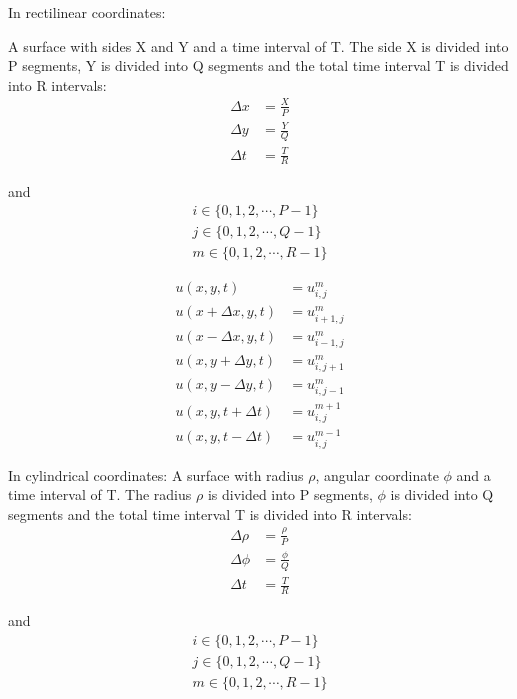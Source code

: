 \documentclass[11pt]{article}
\begin{document}
In rectilinear coordinates:

A surface with sides X and Y and a time interval of T. The side X is
divided into P segments, Y is divided into Q segments and the total time
interval T is divided into R intervals: \begin{equation}
\begin{split} 
\Delta x &= \frac{X}{P} \\
\Delta y &= \frac{Y}{Q} \\
\Delta t &= \frac{T}{R}
\end{split}
\end{equation}

and \begin{equation}
\begin{split} 
i \in \{0, 1, 2, \cdots, P - 1 \} \\
j \in \{0, 1, 2, \cdots, Q - 1 \} \\
m \in \{0, 1, 2, \cdots, R - 1 \}
\end{split}
\end{equation}

\begin{equation}
\begin{split} 
u(x, y, t) &= u_{i,j}^m \\
u(x + \Delta x, y, t) &= u_{i + 1 ,j}^m \\
u(x - \Delta x, y, t) &= u_{i - 1 ,j}^m \\
u(x, y + \Delta y, t) &= u_{i,j + 1}^m \\
u(x, y - \Delta y, t) &= u_{i,j - 1}^m \\
u(x, y, t + \Delta t) &= u_{i,j}^{m + 1} \\
u(x, y, t - \Delta t) &= u_{i,j}^{m - 1} 
\end{split}
\end{equation}

In cylindrical coordinates: A surface with radius \(\rho\), angular
coordinate \(\phi\) and a time interval of T. The radius \(\rho\) is
divided into P segments, \(\phi\) is divided into Q segments and the
total time interval T is divided into R intervals: \begin{equation}
\begin{split} 
\Delta \rho &= \frac{\rho}{P} \\
\Delta \phi &= \frac{\phi}{Q} \\
\Delta t &= \frac{T}{R}
\end{split}
\end{equation}

and \begin{equation}
\begin{split} 
i \in \{0, 1, 2, \cdots, P - 1 \} \\
j \in \{0, 1, 2, \cdots, Q - 1 \} \\
m \in \{0, 1, 2, \cdots, R - 1 \}
\end{split}
\end{equation}
\end{document}
